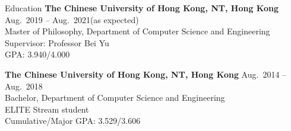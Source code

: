 

\begin{rSection}{Education}
{\bf The Chinese University of Hong Kong, NT, Hong Kong} \hfill {Aug.~2019 -- Aug.~2021(as expected)} \\ 
Master of Philosophy, Department of Computer Science and Engineering \\
Supervisor: Professor Bei Yu \\
GPA: 3.940/4.000

{\bf The Chinese University of Hong Kong, NT, Hong Kong} \hfill {Aug.~2014 -- Aug.~2018} \\ 
Bachelor, Department of Computer Science and Engineering \\
ELITE Stream student \\
Cumulative/Major GPA: 3.529/3.606
\end{rSection}




